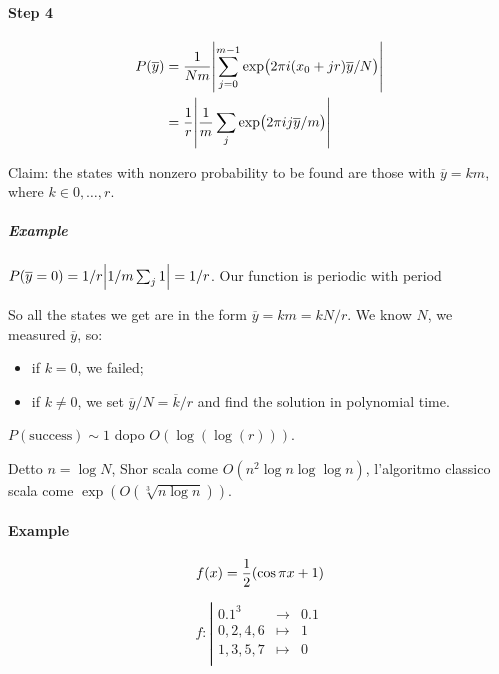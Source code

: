 \paragraph{Step 4}

\begin{align}
  P(\overline{y})
  &= \frac{1}{Nm} \abs{\sum _{j=0} ^{m-1} \exp(2 \pi i (x_0 + jr) \overline{y}/N) }  \\
  &= \frac{1}{r} \abs{\frac{1}{m} \sum_j \exp(2 \pi i j \overline{y} /m)}
\end{align}

Claim: the states with nonzero probability to be found are those with \( \overline{y} = km \), where \( k \in 0, \dots,  r \).

\subparagraph{Example}

\( P(\overline{y} = 0) = 1/r \abs{1/m \sum_j 1} = 1/r \). Our function is periodic with period

So all the states we get are in the form \( \overline{y}=km = kN/r \). We know $N$, we measured \( \overline{y} \), so:

\begin{itemize}
  \item if \( k=0 \), we failed;
  \item if \( k\neq 0 \), we set \( \overline{y}/N = \overline{k}/r \) and find the solution in polynomial time.
\end{itemize}

\( P(\text{success}) \sim 1 \) dopo \( O(\log(\log(r))) \).

Detto \( n = \log N \), Shor scala come \( O(n^2 \log n \log \log n) \), l'algoritmo classico scala come \( \exp(O(\sqrt[3]{n\log n})) \).

\paragraph{Example}

\begin{equation}
  f(x) = \frac{1}{2} \qty(\cos \pi x + 1)
\end{equation}

\[
 f:
\left|
  \begin{array}{rcl}
    \qty{0,1}^3 & \longrightarrow & \qty{0,1} \\
    0,2,4,6 & \longmapsto & 1 \\
    1,3,5,7 & \longmapsto & 0 \\
  \end{array}
\right.
\]

